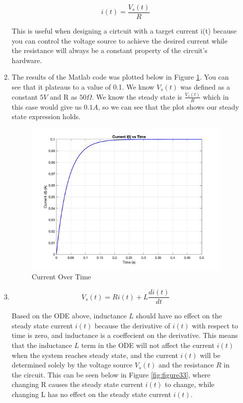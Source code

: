 \documentclass[12pt]{article}
\begin{document}
\begin{enumerate}
\begin{enumerate}
    \[
    i(t) = \frac{V_s(t)}{R}
    \]

    This is useful when designing a cirtcuit with a target current i(t) because you can control the voltage source to achieve the desired current while the resistance will always be a constant property of the circuit's hardware. 

  \item 
    The results of the Matlab code was plotted below in Figure \ref{fig:figure32}. You can see that it plateaus to a value of 0.1. We know $V_s(t)$ was defined as a constant $5 V$ and R as $50 \Omega$. We know the steady state is $\frac{V_s(t)}{R}$ which in this case would give us $0.1 A$, so we can see that the plot shows our steady state expression holds.

    \begin{figure}[H]
      \centering
      \includegraphics[width=\textwidth]{Figures/figure32.png}
      \caption{Current Over Time}
      \label{fig:figure32}
    \end{figure}

  \item 
    
    \[
    V_s(t) = Ri(t) + L\frac{di(t)}{dt}
    \]
  
    Based on the ODE above, inductance $L$ should have no effect on the steady state current $i(t)$ because the derivative of $i(t)$ with respect to time is zero, and inductance is a coeffecient on the derivative. This means that the inductance $L$ term in the ODE will not affect the current $i(t)$ when the system reaches steady state, and the current $i(t)$ will be determined solely by the voltage source $V_s(t)$ and the resistance $R$ in the circuit. This can be seen below in Figure \ref{fig:figure33}, where changing R causes the steady state current $i(t)$ to change, while changing L has no effect on the steady state current $i(t)$.


\end{enumerate}
\end{enumerate}
\end{document}
